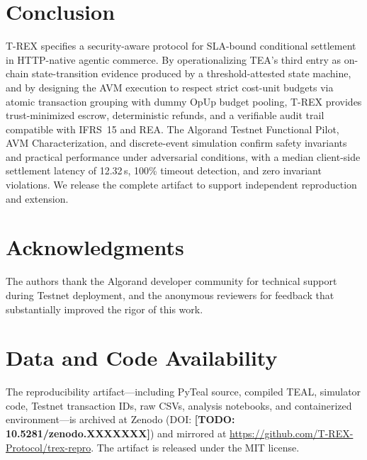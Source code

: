 \documentclass[journal]{IEEEtran}
\newcommand{\TODO}[1]{{\color{red}\textbf{[TODO: #1]}}}
\begin{document}
\section{Conclusion}
\label{sec:conclusion}

T-REX specifies a security-aware protocol for SLA-bound conditional
settlement in HTTP-native agentic commerce.
By operationalizing TEA's third entry as on-chain state-transition
evidence produced by a threshold-attested state machine, and by
designing the AVM execution to respect strict cost-unit budgets via
atomic transaction grouping with dummy OpUp budget pooling, T-REX
provides trust-minimized escrow, deterministic refunds, and a
verifiable audit trail compatible with IFRS~15 and REA.
The Algorand Testnet Functional Pilot, AVM Characterization, and
discrete-event simulation confirm safety invariants and practical
performance under adversarial conditions, with a median client-side
settlement latency of 12.32\,s, 100\% timeout detection, and zero
invariant violations.
We release the complete artifact to support independent reproduction
and extension.

\section*{Acknowledgments}
The authors thank the Algorand developer community for technical
support during Testnet deployment, and the anonymous reviewers for
feedback that substantially improved the rigor of this work.

\section*{Data and Code Availability}
\label{sec:reproducibility}
The reproducibility artifact---including PyTeal source, compiled
TEAL, simulator code, Testnet transaction IDs, raw CSVs, analysis
notebooks, and containerized environment---is archived at Zenodo
(DOI: \TODO{10.5281/zenodo.XXXXXXX}) and mirrored at
\url{https://github.com/T-REX-Protocol/trex-repro}.
The artifact is released under the MIT license.
\end{document}
